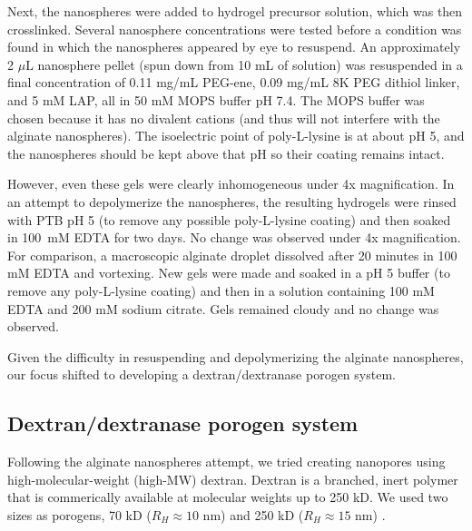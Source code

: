 Next, the nanospheres were added to hydrogel precursor solution, which was then crosslinked.  Several nanosphere concentrations were tested before a condition was found in which the nanospheres appeared by eye to resuspend.  An approximately 2 $\mu$L nanosphere pellet (spun down from 10 mL of solution) was resuspended in a final concentration of 0.11 mg/mL PEG-ene, 0.09 mg/mL 8K PEG dithiol linker, and 5 mM LAP, all in 50 mM MOPS buffer pH 7.4.  The MOPS buffer was chosen because it has no divalent cations (and thus will not interfere with the alginate nanospheres).  The isoelectric point of poly-L-lysine is at about pH 5, and the nanospheres should be kept above that pH so their coating remains intact.

However, even these gels were clearly inhomogeneous under 4x magnification.  In an attempt to depolymerize the nanospheres, the resulting hydrogels were rinsed with PTB pH 5 (to remove any possible poly-L-lysine coating) and then soaked in 100~mM EDTA for two days.  No change was observed under 4x magnification.  For comparison, a macroscopic alginate droplet dissolved after 20 minutes in 100 mM EDTA and vortexing.  New gels were made and soaked in a pH 5 buffer (to remove any poly-L-lysine coating) and then in a solution containing 100 mM EDTA and 200 mM sodium citrate.  Gels remained cloudy and no change was observed.

Given the difficulty in resuspending and depolymerizing the alginate nanospheres, our focus shifted to developing a dextran/dextranase porogen system.

\subsection{Dextran/dextranase porogen system}
Following the alginate nanospheres attempt, we tried creating nanopores using high-molecular-weight (high-MW) dextran.  Dextran is a branched, inert polymer that is commerically available at molecular weights up to 250 kD.  We used two sizes as porogens, 70 kD ($R_H \approx 10$ nm) and 250 kD ($R_H \approx 15$ nm) \cite{masuelli13}.  

